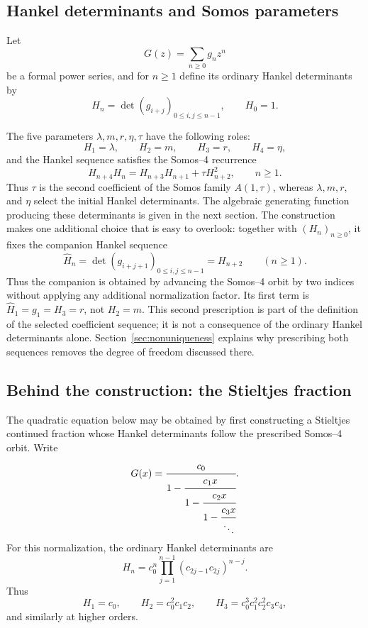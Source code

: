 \documentclass[11pt]{article}
\theoremstyle{remark}
\begin{document}
\subsection{Hankel determinants and Somos parameters}

Let
\[
 G(z)=\sum_{n\geq0}g_nz^n
\]
be a formal power series, and for $n\geq1$ define its ordinary Hankel
determinants by
\begin{equation}
 H_n=\det(g_{i+j})_{0\leq i,j\leq n-1},
 \qquad H_0=1.
 \label{eq:Hankel}
\end{equation}

The five parameters $\lambda,m,r,\eta,\tau$ have the following roles:
\begin{equation}
 H_1=\lambda,\qquad H_2=m,\qquad H_3=r,\qquad H_4=\eta,
 \label{eq:initial-Hankel}
\end{equation}
and the Hankel sequence satisfies the Somos--4 recurrence
\begin{equation}
 H_{n+4}H_n=H_{n+3}H_{n+1}+\tau H_{n+2}^2,\qquad n\geq1.
 \label{eq:Somos}
\end{equation}
Thus $\tau$ is the second coefficient of the Somos family $A(1,\tau)$,
whereas $\lambda,m,r,$ and $\eta$ select the initial Hankel determinants.
The algebraic generating function producing these determinants is given in
the next section.  The construction makes one additional choice that is easy
to overlook: together with $(H_n)_{n\geq0}$, it fixes the companion
Hankel sequence
\begin{equation}
 \widehat H_n=\det(g_{i+j+1})_{0\leq i,j\leq n-1}
 =H_{n+2}\qquad(n\geq1).
 \label{eq:companion-Hankel-choice}
\end{equation}
Thus the companion is obtained by advancing the Somos--4 orbit by two indices
without applying any additional normalization factor.  Its first term is
$\widehat H_1=g_1=H_3=r$, not $H_2=m$.  This second prescription is part
of the definition of the selected coefficient sequence; it is not a
consequence of the ordinary Hankel determinants alone.  Section~\ref{sec:nonuniqueness} explains why prescribing
both sequences removes the degree of freedom discussed there.

\subsection{Behind the construction: the Stieltjes fraction}
The quadratic equation below may be obtained by first constructing a
Stieltjes continued fraction whose Hankel determinants follow the prescribed
Somos--4 orbit.  Write
\begin{equation}
 G(x)=\cfrac{c_0}{1-\cfrac{c_1x}{1-\cfrac{c_2x}{1-\cfrac{c_3x}{\ddots}}}}.
 \label{eq:S-fraction}
\end{equation}
For this normalization, the ordinary Hankel determinants are\cite{Wall1948,JonesThron1980,Flajolet1980}
\begin{equation}
 H_n=c_0^n\prod_{j=1}^{n-1}(c_{2j-1}c_{2j})^{n-j}.
 \label{eq:S-fraction-Hankel}
\end{equation}
Thus
\[
 H_1=c_0,\qquad
 H_2=c_0^2c_1c_2,\qquad
 H_3=c_0^3c_1^2c_2^2c_3c_4,
\]
and similarly at higher orders.
\end{document}
